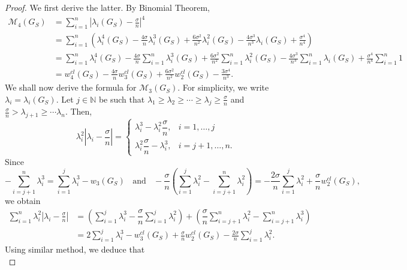 \documentclass[12pt,a4paper,reqno]{amsart}
\numberwithin{equation}{section}
\theoremstyle{plain}
\theoremstyle{definition}
\newcommand{\<}{\langle}
\renewcommand{\>}{\rangle}
\newcommand{\cM}{{\mathcal M}}
\newcommand{\N}{{\mathbb N}}
\begin{document}
\begin{proof}
We first derive the latter. By Binomial Theorem,
\begin{align*}
\cM_4(G_S)
&= \sum^n_{i=1} \left|\lambda_i(G_S) - \frac{\sigma}{n} \right|^4 \\
&= \sum^n_{i=1} \left( \lambda_i^4(G_S) - \frac{4\sigma}{n}\lambda_i^3(G_S) +  \frac{6\sigma^2}{n^2}\lambda_i^2(G_S) - \frac{4\sigma^3}{n^3}\lambda_i(G_S) + \frac{\sigma^4}{n^4} \right) \\
&= \sum^n_{i=1} \lambda_i^4(G_S) - \frac{4\sigma}{n}\sum^n_{i=1}\lambda_i^3(G_S) +  \frac{6\sigma^2}{n^2}\sum^n_{i=1}\lambda_i^2(G_S) - \frac{4\sigma^3}{n^3}\sum^n_{i=1}\lambda_i(G_S) + \frac{\sigma^4}{n^4}\sum^n_{i=1} 1 \\
&= w_4^{cl}(G_S) - \frac{4\sigma}{n}w_3^{cl}(G_S) +  \frac{6\sigma^2}{n^2}w_2^{cl}(G_S) - \frac{3\sigma^4}{n^3}. %
\end{align*}
We shall now derive the formula for $\cM_3(G_S)$. For simplicity, we write $\lambda_i=\lambda_i(G_S).$  Let $j \in \N$ be such that $\lambda_1 \geq \lambda_2 \geq \cdots \geq \lambda_j \geq \frac{\sigma}{n}$ and $\frac{\sigma}{n}>\lambda_{j+1} \geq \cdots \lambda_n.$ Then, 
\[
\lambda^2_i\left| \lambda_i - \frac{\sigma}{n}\right|= 
\begin{cases}
  \lambda_i^3 - \lambda_i^2\dfrac{\sigma}{n}, & i=1,\ldots,j \\
  \lambda_i^2\dfrac{\sigma}{n} - \lambda_i^3, & i=j+1,\ldots, n.
\end{cases}
\] 
Since 
\[
-\sum^n_{i=j+1} \lambda_i^3 = \sum^j_{i=1}\lambda_i^3 - w_3(G_S) \;\;\text{ and }\;\;
-\dfrac{\sigma}{n} \left(\sum^j_{i=1} \lambda_i^2 - \sum^n_{i=j+1}\lambda_i^2\right) = 
- \dfrac{2\sigma}{n}\sum^j_{i=1} \lambda_i^2 + \frac{\sigma}{n}w_2^{cl}(G_S),
\]
we obtain
\begin{align*}
\sum^n_{i=1}\lambda^2_i\left| \lambda_i - \frac{\sigma}{n}\right|
&=  \left( \sum^j_{i=1} \lambda_i^3 - \dfrac{\sigma}{n}\sum^j_{i=1}\lambda_i^2 \right) + \left( \dfrac{\sigma}{n}\sum^n_{i=j+1}\lambda_i^2 - \sum^n_{i=j+1} \lambda_i^3  \right) \\
&= 2\sum^j_{i=1} \lambda_i^3 - w_3^{cl}(G_S)  + \frac{\sigma}{n}w_2^{cl}(G_S) - \frac{2\sigma}{n} \sum^j_{i=1} \lambda_i^2 . %
\end{align*}
Using similar method, we deduce that 
\[
\]
\end{proof}
\end{document}
